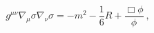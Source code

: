 \begin{equation}
g^{\mu\nu}\nabla_{\mu}\sigma \nabla_{\nu}\sigma =-m^2-\frac{1}{6}R
+\frac{\Box \phi}{\phi}~, \label{14}\end{equation} 
